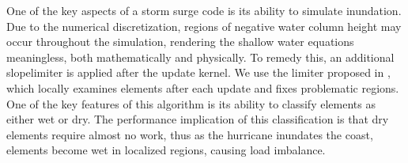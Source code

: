 One of the key aspects of a storm surge code is its ability to simulate inundation.
Due to the numerical discretization, regions of negative water column height may occur throughout the simulation, rendering the shallow water equations meaningless, both mathematically and physically.
To remedy this, an additional slopelimiter is applied after the update kernel.
We use the limiter proposed in \cite{Bunya2009}, which locally examines elements after each update and fixes problematic regions.
One of the key features of this algorithm is its ability to classify elements as either wet or dry.
The performance implication of this classification is that dry elements require almost no work, thus as the hurricane inundates the coast, elements become wet in localized regions, causing load imbalance.

